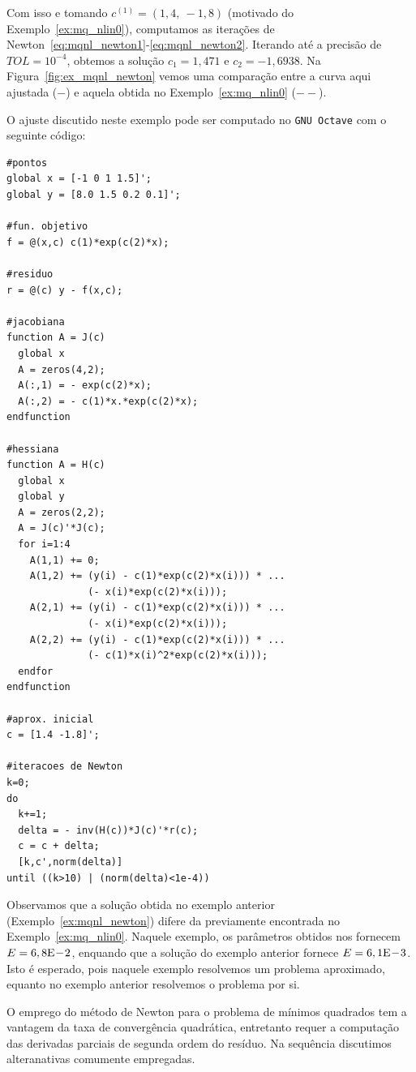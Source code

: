 \begin{ex}
Com isso e tomando $c^{(1)} = (1,4, ~-1,8)$ (motivado do Exemplo~\ref{ex:mq_nlin0}), computamos as iterações de Newton~\eqref{eq:mqnl_newton1}-\eqref{eq:mqnl_newton2}. Iterando até a precisão de $TOL = 10^{-4}$, obtemos a solução $c_1 = 1,471$ e $c_2 = -1,6938$. Na Figura~\ref{fig:ex_mqnl_newton} vemos uma comparação entre a curva aqui ajustada ($-$) e aquela obtida no Exemplo~\ref{ex:mq_nlin0} ($--$).

\ifisoctave
O ajuste discutido neste exemplo pode ser computado no \verb+GNU Octave+ com o seguinte código:
\begin{verbatim}
#pontos
global x = [-1 0 1 1.5]';
global y = [8.0 1.5 0.2 0.1]';

#fun. objetivo
f = @(x,c) c(1)*exp(c(2)*x);

#residuo
r = @(c) y - f(x,c);

#jacobiana
function A = J(c)
  global x
  A = zeros(4,2);
  A(:,1) = - exp(c(2)*x);
  A(:,2) = - c(1)*x.*exp(c(2)*x);
endfunction

#hessiana
function A = H(c)
  global x
  global y
  A = zeros(2,2);
  A = J(c)'*J(c);
  for i=1:4
    A(1,1) += 0;
    A(1,2) += (y(i) - c(1)*exp(c(2)*x(i))) * ...
              (- x(i)*exp(c(2)*x(i)));
    A(2,1) += (y(i) - c(1)*exp(c(2)*x(i))) * ...
              (- x(i)*exp(c(2)*x(i)));
    A(2,2) += (y(i) - c(1)*exp(c(2)*x(i))) * ...
              (- c(1)*x(i)^2*exp(c(2)*x(i)));
  endfor
endfunction

#aprox. inicial
c = [1.4 -1.8]';

#iteracoes de Newton
k=0;
do
  k+=1;
  delta = - inv(H(c))*J(c)'*r(c);
  c = c + delta;
  [k,c',norm(delta)]
until ((k>10) | (norm(delta)<1e-4))
\end{verbatim}
\fi
\end{ex}

Observamos que a solução obtida no exemplo anterior (Exemplo~\ref{ex:mqnl_newton}) difere da previamente encontrada no Exemplo~\ref{ex:mq_nlin0}. Naquele exemplo, os parâmetros obtidos nos fornecem $E = 6,8\mathrm{E}\!-\!2$, enquando que a solução do exemplo anterior fornece $E = 6,1\mathrm{E}\!-\!3$. Isto é esperado, pois naquele exemplo resolvemos um problema aproximado, equanto no exemplo anterior resolvemos o problema por si.

O emprego do método de Newton para o problema de mínimos quadrados tem a vantagem da taxa de convergência quadrática, entretanto requer a computação das derivadas parciais de segunda ordem do resíduo. Na sequência discutimos alteranativas comumente empregadas.

